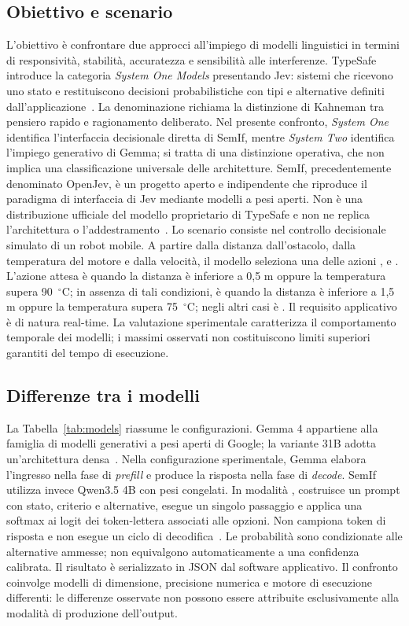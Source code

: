 \documentclass[conference]{IEEEtran}
\newcommand{\code}[1]{\texttt{\detokenize{#1}}}
\begin{document}
\subsection{Obiettivo e scenario}
L'obiettivo è confrontare due approcci all'impiego di modelli linguistici in termini di responsività, stabilità, accuratezza e sensibilità alle interferenze. TypeSafe introduce la categoria \emph{System One Models} presentando Jev: sistemi che ricevono uno stato e restituiscono decisioni probabilistiche con tipi e alternative definiti dall'applicazione~\cite{typesafe}. La denominazione richiama la distinzione di Kahneman tra pensiero rapido e ragionamento deliberato. Nel presente confronto, \emph{System One} identifica l'interfaccia decisionale diretta di SemIf, mentre \emph{System Two} identifica l'impiego generativo di Gemma; si tratta di una distinzione operativa, che non implica una classificazione universale delle architetture.
SemIf, precedentemente denominato OpenJev, è un progetto aperto e indipendente che riproduce il paradigma di interfaccia di Jev mediante modelli a pesi aperti. Non è una distribuzione ufficiale del modello proprietario di TypeSafe e non ne replica l'architettura o l'addestramento~\cite{openjev}.
Lo scenario consiste nel controllo decisionale simulato di un robot mobile. A partire dalla distanza dall'ostacolo, dalla temperatura del motore e dalla velocità, il modello seleziona una delle azioni \code{proceed}, \code{slow_down} e \code{stop}. L'azione attesa è \code{stop} quando la distanza è inferiore a 0,5 m oppure la temperatura supera 90~$^\circ$C; in assenza di tali condizioni, è \code{slow_down} quando la distanza è inferiore a 1,5 m oppure la temperatura supera 75~$^\circ$C; negli altri casi è \code{proceed}.
Il requisito applicativo è di natura real-time. La valutazione sperimentale caratterizza il comportamento temporale dei modelli; i massimi osservati non costituiscono limiti superiori garantiti del tempo di esecuzione.
\subsection{Differenze tra i modelli}
La Tabella~\ref{tab:models} riassume le configurazioni. Gemma 4 appartiene alla famiglia di modelli generativi a pesi aperti di Google; la variante 31B adotta un'architettura densa~\cite{gemma-core,gemma-card}. Nella configurazione sperimentale, Gemma elabora l'ingresso nella fase di \emph{prefill} e produce la risposta nella fase di \emph{decode}.
SemIf utilizza invece Qwen3.5 4B con pesi congelati. In modalità \code{direct}, costruisce un prompt con stato, criterio e alternative, esegue un singolo passaggio e applica una softmax ai logit dei token-lettera associati alle opzioni. Non campiona token di risposta e non esegue un ciclo di decodifica~\cite{openjev-method}. Le probabilità sono condizionate alle alternative ammesse; non equivalgono automaticamente a una confidenza calibrata. Il risultato è serializzato in JSON dal software applicativo.
Il confronto coinvolge modelli di dimensione, precisione numerica e motore di esecuzione differenti: le differenze osservate non possono essere attribuite esclusivamente alla modalità di produzione dell'output.
\end{document}
